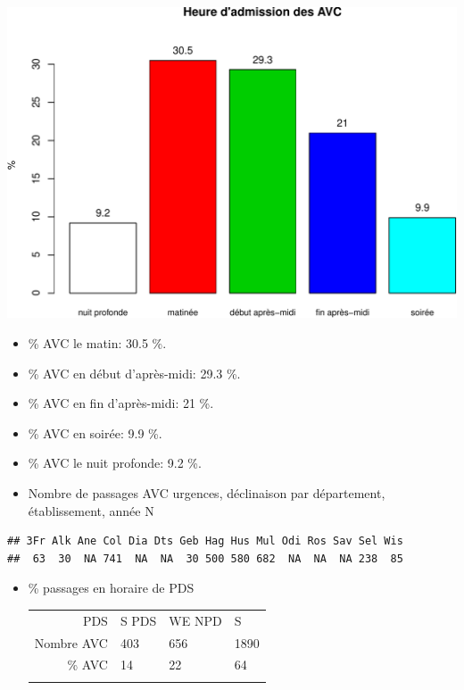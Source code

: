 \documentclass[]{article}
\begin{document}
\includegraphics{rapport2014_V4_files/figure-latex/avc_periode-1.pdf}

\begin{itemize}
\item
  \% AVC le matin: 30.5 \%.
\item
  \% AVC en début d'après-midi: 29.3 \%.
\item
  \% AVC en fin d'après-midi: 21 \%.
\item
  \% AVC en soirée: 9.9 \%.
\item
  \% AVC le nuit profonde: 9.2 \%.
\item
  Nombre de passages AVC urgences, déclinaison par département,
  établissement, année N
\end{itemize}

\begin{verbatim}
## 3Fr Alk Ane Col Dia Dts Geb Hag Hus Mul Odi Ros Sav Sel Wis 
##  63  30  NA 741  NA  NA  30 500 580 682  NA  NA  NA 238  85
\end{verbatim}

\begin{itemize}
\item
  \% passages en horaire de PDS

  \begin{longtable}[c]{@{}rlll@{}}
  \toprule\addlinespace
  PDS & S PDS & WE NPD & S
  \\\addlinespace
  \midrule\endhead
  Nombre AVC & 403 & 656 & 1890
  \\\addlinespace
  \% AVC & 14 & 22 & 64
  \\\addlinespace
  \bottomrule
  \end{longtable}
\end{itemize}
\end{document}
